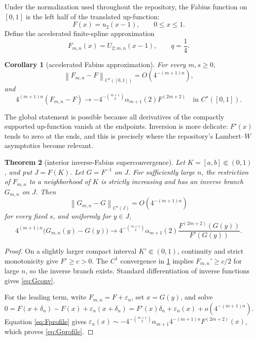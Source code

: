 \documentclass[11pt]{article}
\newtheorem{theorem}{Theorem}[section]
\newtheorem{corollary}[theorem]{Corollary}
\theoremstyle{definition}
\theoremstyle{remark}
\newcommand{\norm}[1]{\left\lVert #1\right\rVert}
\begin{document}
Under the normalization used throughout the repository, the Fabius function on
\([0,1]\) is the left half of the translated up-function:
\begin{equation}
 F(x)=u_2(x-1),\qquad 0\leq x\leq1.
 \label{eq:Fshift}
\end{equation}
Define the accelerated finite-spline approximation
\begin{equation}
 F_{m,n}(x)=U_{2;m,n}(x-1),\qquad q=\frac14.
 \label{eq:Fapprox}
\end{equation}

\begin{corollary}[accelerated Fabius approximation]
\label{cor:Fconv}
For every \(m,s\geq0\),
\begin{equation}
 \norm{F_{m,n}-F}_{C^s([0,1])}
 =O\!\left(4^{-(m+1)n}\right),
 \label{eq:Fconv}
\end{equation}
and
\begin{equation}
 4^{(m+1)n}(F_{m,n}-F)
 \longrightarrow
 -4^{-\binom{m+1}{2}}\alpha_{m+1}(2)F^{(2m+2)}
 \quad\text{in }C^s([0,1]).
 \label{eq:Fprofile}
\end{equation}
\end{corollary}

The global statement is possible because all derivatives of the compactly
supported up-function vanish at the endpoints. Inversion is more delicate:
\(F'(x)\) tends to zero at the ends, and this is precisely where the repository's
Lambert--\(W\) asymptotics become relevant.

\begin{theorem}[interior inverse-Fabius superconvergence]
\label{thm:inverse}
Let \(K=[a,b]\Subset(0,1)\), and put \(J=F(K)\). Let \(G=F^{-1}\) on \(J\).
For sufficiently large \(n\), the restriction of \(F_{m,n}\) to a neighborhood
of \(K\) is strictly increasing and has an inverse branch \(G_{m,n}\) on \(J\).
Then
\begin{equation}
 \norm{G_{m,n}-G}_{C^s(J)}
 =O\!\left(4^{-(m+1)n}\right)
 \label{eq:Gconv}
\end{equation}
for every fixed \(s\), and uniformly for \(y\in J\),
\begin{equation}
 4^{(m+1)n}\bigl(G_{m,n}(y)-G(y)\bigr)
 \longrightarrow
 4^{-\binom{m+1}{2}}\alpha_{m+1}(2)
 \frac{F^{(2m+2)}(G(y))}{F'(G(y))}.
 \label{eq:Gprofile}
\end{equation}
\end{theorem}

\begin{proof}
On a slightly larger compact interval \(K'\Subset(0,1)\), continuity and strict
monotonicity give \(F'\geq c>0\). The \(C^1\) convergence in
\cref{cor:Fconv} implies \(F_{m,n}'\geq c/2\) for large \(n\), so the inverse
branch exists. Standard differentiation of inverse functions gives
\eqref{eq:Gconv}.

For the leading term, write \(F_{m,n}=F+\varepsilon_n\), set \(x=G(y)\), and
solve
\[
 0=F(x+\delta_n)-F(x)+\varepsilon_n(x+\delta_n)
 =F'(x)\delta_n+\varepsilon_n(x)+o(4^{-(m+1)n}).
\]
Equation \eqref{eq:Fprofile} gives
\(\varepsilon_n(x)\sim
 -4^{-\binom{m+1}{2}}\alpha_{m+1}4^{-(m+1)n}F^{(2m+2)}(x)\),
which proves \eqref{eq:Gprofile}.
\end{proof}
\end{document}
